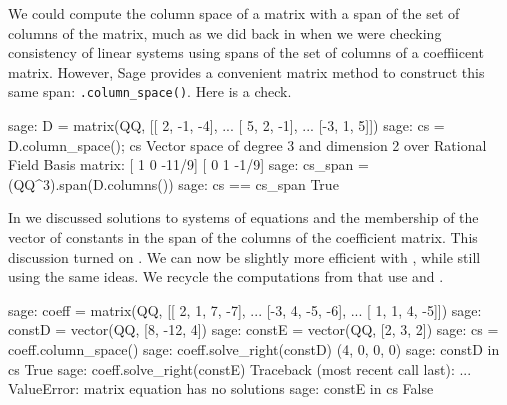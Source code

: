 We could compute the column space of a matrix with a span of the set of columns of the matrix, much as we did back in  when we were checking consistency of linear systems using spans of the set of columns of a coeffiicent matrix.  However, Sage provides a convenient matrix method to construct this same span: \verb?.column_space()?.  Here is a check.
%
\begin{sageexample}
sage: D = matrix(QQ, [[ 2, -1, -4],
...                   [ 5,  2, -1],
...                   [-3,  1,  5]])
sage: cs = D.column_space(); cs
Vector space of degree 3 and dimension 2 over Rational Field
Basis matrix:
[    1     0 -11/9]
[    0     1  -1/9]
sage: cs_span = (QQ^3).span(D.columns())
sage: cs == cs_span
True
\end{sageexample}
%
In  we discussed solutions to systems of equations and the membership of the vector of constants in the span of the columns of the coefficient matrix.  This discussion turned on .  We can now be slightly more efficient with , while still using the same ideas.  We recycle the computations from  that use  and .
%
\begin{sageexample}
sage: coeff = matrix(QQ, [[ 2, 1,  7, -7],
...                       [-3, 4, -5, -6],
...                       [ 1, 1,  4, -5]])
sage: constD = vector(QQ, [8, -12, 4])
sage: constE = vector(QQ, [2, 3, 2])
sage: cs = coeff.column_space()
sage: coeff.solve_right(constD)
(4, 0, 0, 0)
sage: constD in cs
True
sage: coeff.solve_right(constE)
Traceback (most recent call last):
...
ValueError: matrix equation has no solutions
sage: constE in cs
False
\end{sageexample}
%
\begin{sageverbatim}
\end{sageverbatim}
%









